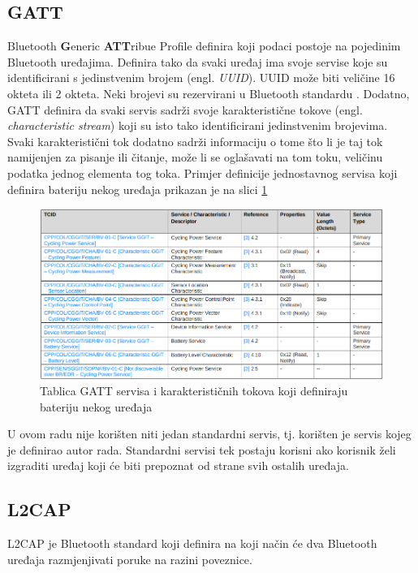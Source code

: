 \documentclass[times, utf8, diplomski]{diplomski}
\begin{document}
\subsection{GATT}
Bluetooth \textbf{G}eneric \textbf{ATT}ribue Profile definira koji podaci postoje na pojedinim Bluetooth uređajima. Definira tako da svaki uređaj ima svoje servise koje su identificirani s jedinstvenim brojem (engl. \textit{UUID}). UUID može biti veličine 16 okteta ili 2 okteta. Neki brojevi su rezervirani u Bluetooth standardu \cite{core41}.
Dodatno, GATT definira da svaki servis sadrži svoje karakteristične tokove (engl. \textit{characteristic stream}) koji su isto tako identificirani jedinstvenim brojevima. Svaki karakteristični tok dodatno sadrži informaciju o tome što li je taj tok namijenjen za pisanje ili čitanje, može li se oglašavati na tom toku, veličinu podatka jednog elementa tog toka. Primjer definicije jednostavnog servisa koji definira bateriju nekog uređaja prikazan je na slici \ref{fig:gattexample}

\begin{figure}[H]
\includegraphics[width=\textwidth]{examplegatt_20230623_212042.png}
\centering
\caption{Tablica GATT servisa i karakterističnih tokova koji definiraju bateriju nekog uređaja}
\label{fig:gattexample}
\end{figure}

U ovom radu nije korišten niti jedan standardni servis, tj. korišten je servis kojeg je definirao autor rada. Standardni servisi tek postaju korisni ako korisnik želi izgraditi uređaj koji će biti prepoznat od strane svih ostalih uređaja.

\subsection{L2CAP}
L2CAP je Bluetooth standard koji definira na koji način će dva Bluetooth uređaja razmjenjivati poruke na razini poveznice.
\end{document}
